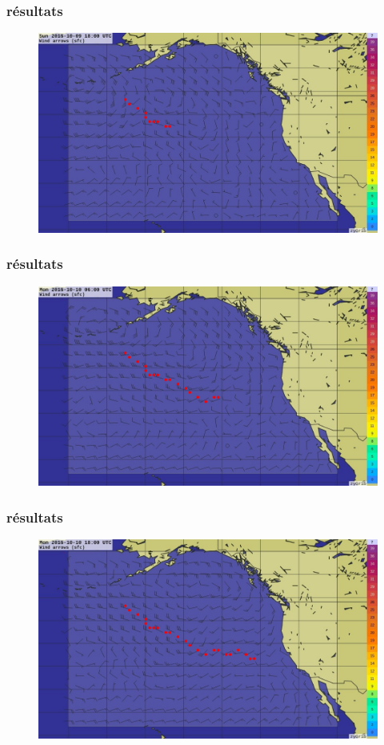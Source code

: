\documentclass{beamer}
\begin{document}
\begin{frame}\frametitle{résultats}
\begin{figure}
\includegraphics[scale=0.3]{result22.jpg} 
\end{figure}
\end{frame}

\begin{frame}\frametitle{résultats}
\begin{figure}
\includegraphics[scale=0.3]{result33.jpg} 
\end{figure}
\end{frame}

\begin{frame}\frametitle{résultats}
\begin{figure}
\includegraphics[scale=0.3]{result44.jpg} 
\end{figure}
\end{frame}
\end{document}

